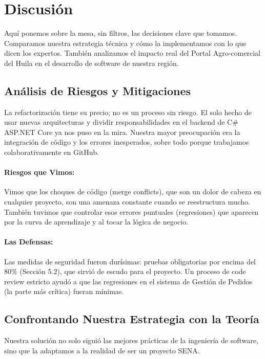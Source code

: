 \section{Discusión}

Aquí ponemos sobre la mesa, sin filtros, las decisiones clave que tomamos. Comparamos nuestra estrategia técnica y cómo la implementamos con lo que dicen los expertos. También analizamos el impacto real del Portal Agro-comercial del Huila en el desarrollo de software de nuestra región.

\subsection{Análisis de Riesgos y Mitigaciones}

La refactorización tiene su precio; no es un proceso sin riesgo. El solo hecho de usar nuevas arquitecturas y dividir responsabilidades en el backend de C\# ASP.NET Core ya nos puso en la mira. Nuestra mayor preocupación era la integración de código y los errores inesperados, sobre todo porque trabajamos colaborativamente en GitHub.

\paragraph{Riesgos que Vimos:}

Vimos que los choques de código (merge conflicts), que son un dolor de cabeza en cualquier proyecto, son una amenaza constante cuando se reestructura mucho. También tuvimos que controlar esos errores puntuales (regresiones) que aparecen por la curva de aprendizaje y al tocar la lógica de negocio.

\paragraph{Las Defensas:}

Las medidas de seguridad fueron durísimas: pruebas obligatorias por encima del 80\% (Sección 5.2), que sirvió de escudo para el proyecto. Un proceso de code review estricto ayudó a que las regresiones en el sistema de Gestión de Pedidos (la parte más crítica) fueran mínimas.

\subsection{Confrontando Nuestra Estrategia con la Teoría}

Nuestra solución no solo siguió las mejores prácticas de la ingeniería de software, sino que la adaptamos a la realidad de ser un proyecto SENA.

